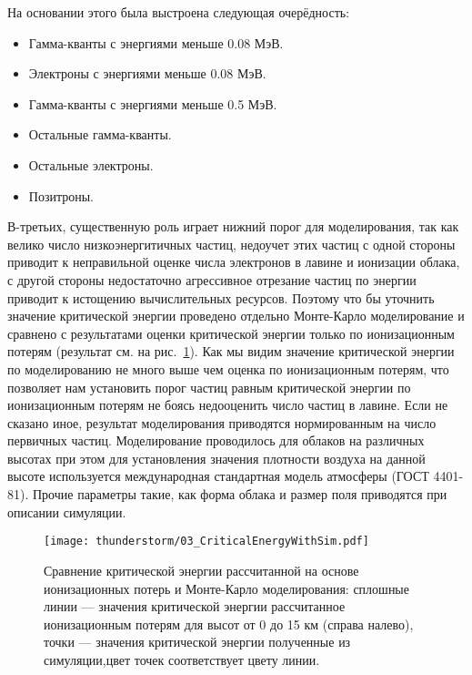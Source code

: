 На основании этого была выстроена следующая очерёдность:
\begin{itemize}
    \item Гамма-кванты с энергиями меньше 0.08 МэВ.
    \item Электроны с энергиями меньше 0.08 МэВ.
    \item Гамма-кванты с энергиями меньше 0.5 МэВ.
    \item Остальные гамма-кванты.
    \item Остальные электроны.
    \item Позитроны.
\end{itemize}
В-третьих, существенную роль играет нижний порог для моделирования, так как велико число низкоэнергитичных частиц, недоучет этих частиц с одной стороны приводит к неправильной оценке числа электронов в лавине и ионизации облака, с другой стороны недостаточно агрессивное отрезание частиц по энергии приводит к истощению вычислительных ресурсов. Поэтому что бы уточнить значение критической энергии проведено отдельно Монте-Карло моделирование и сравнено с результатами оценки критической энергии только по ионизационным потерям (результат см. на рис.~\ref{fig:storm:simcrit}). Как мы видим значение критической энергии по моделированию не много выше чем оценка по ионизационным потерям, что позволяет нам установить порог частиц равным критической энергии по ионизационным потерям не боясь недооценить число частиц в лавине.
Если не сказано иное, результат моделирования приводятся нормированным на число первичных частиц. Моделирование проводилось для облаков на различных высотах при этом для установления значения плотности воздуха на данной высоте используется международная стандартная модель атмосферы (ГОСТ 4401-81). Прочие параметры такие, как форма облака и размер поля приводятся при описании симуляции.


\begin{figure}[t]
	\begin{center}
		\texttt{[image: thunderstorm/03\_CriticalEnergyWithSim.pdf]} 
		\caption{Сравнение критической энергии рассчитанной на основе ионизационных потерь и Монте-Карло моделирования: сплошные линии --- значения критической энергии рассчитанное ионизационным потерям для высот от 0 до 15 км (справа налево), точки --- значения критической энергии полученные из симуляции,цвет точек соответствует цвету линии. }
	\end{center}
	\label{fig:storm:simcrit}
\end{figure}

